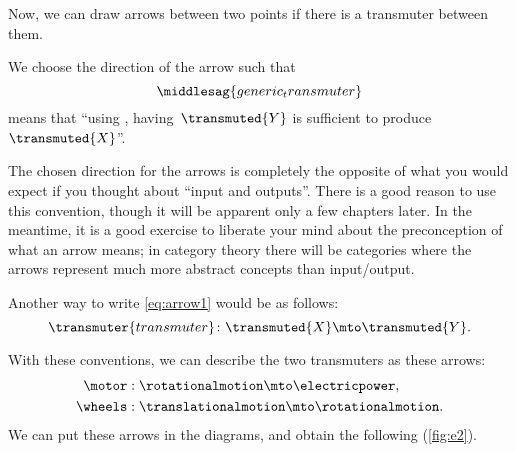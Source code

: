 Now, we can draw arrows between two points if there is a transmuter between them.

We choose the direction of the arrow such that
%
\begin{equation}
    \label{eq:arrow1}
    \middlesag{generic_transmuter}
\end{equation}
means that ``using , having~$\transmuted{Y}$ is sufficient to produce~$\transmuted{X}$''.

\begin{remark}
    The chosen direction for the arrows is completely the opposite of what you would expect if you thought about ``input and outputs''.
    There is a good reason to use this convention, though it will be apparent only a few chapters later.
    In the meantime, it is a good exercise to liberate your mind about the preconception of what an arrow means; in category theory there will be categories where the arrows represent much more abstract concepts than input/output.
\end{remark}

Another way to write \cref{eq:arrow1} would be as follows:
\begin{equation}
    \transmuter{transmuter} \colon \transmuted{X} \mto \transmuted{Y}.
\end{equation}

With these conventions, we can describe the two transmuters as these arrows:
%
\begin{equation}
    \label{eq:transmutation_example}
    \begin{aligned}
        \motor  & :  \rotationalmotion \mto \electricpower, \\
        \wheels & : \translationalmotion \mto \rotationalmotion.
    \end{aligned}
\end{equation}
%
We can put these arrows in the diagrams, and obtain the following (\cref{fig:e2}).



